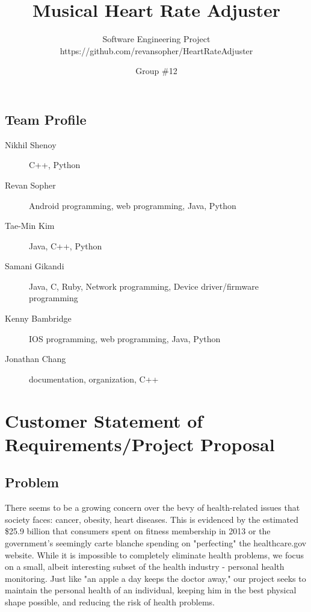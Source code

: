 \documentclass[letterpaper,english, 12pt]{scrreprt}
\title{Musical Heart Rate Adjuster}
\subtitle{Software Engineering Project \\ https://github.com/revansopher/HeartRateAdjuster}
\author{Group \#12}
\begin{document}
\maketitle

\tableofcontents

\section*{Team Profile}
\begin{description}
	\item[Nikhil Shenoy] C++, Python
	\item[Revan Sopher] Android programming, web programming, Java, Python
	\item[Tae-Min Kim] Java, C++, Python
	\item[Samani Gikandi] Java, C, Ruby, Network programming, Device driver/firmware programming
	\item[Kenny Bambridge] IOS programming, web programming, Java, Python
	\item[Jonathan Chang] documentation, organization, C++
\end{description}
 
\chapter{Customer Statement of Requirements/Project Proposal}
 
\section{Problem}
There seems to be a growing concern over the bevy of health-related issues that society faces: cancer, obesity, heart diseases. This is evidenced by the estimated \$25.9 billion that consumers spent on fitness membership in 2013 or the government's seemingly carte blanche spending on "perfecting" the healthcare.gov website. While it is impossible to completely eliminate health problems, we focus on a small, albeit interesting subset of the health industry - personal health monitoring. Just like "an apple a day keeps the doctor away," our project seeks to maintain the personal health of an individual, keeping him in the best physical shape possible, and reducing the risk of health problems.
 
\end{document}
